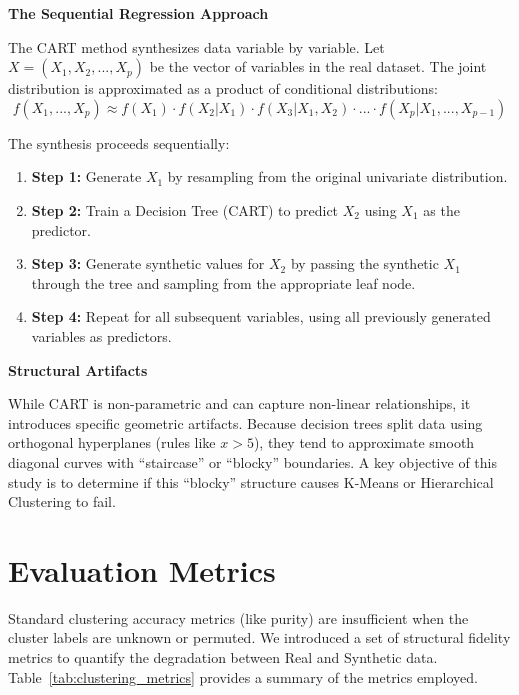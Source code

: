 \textbf{The Sequential Regression Approach}

The CART method synthesizes data variable by variable. Let $X = (X_1, X_2, ..., X_p)$ be the vector of variables in the real dataset. The joint distribution is approximated as a product of conditional distributions:
\begin{equation}
  f(X_1, ..., X_p) \approx f(X_1) \cdot f(X_2|X_1) \cdot f(X_3|X_1, X_2) \cdot ... \cdot f(X_p|X_1, ..., X_{p-1})
\end{equation}

The synthesis proceeds sequentially:
\begin{enumerate}
  \item \textbf{Step 1:} Generate $X_1$ by resampling from the original univariate distribution.
  \item \textbf{Step 2:} Train a Decision Tree (CART) to predict $X_2$ using $X_1$ as the predictor.
  \item \textbf{Step 3:} Generate synthetic values for $X_2$ by passing the synthetic $X_1$ through the tree and sampling from the appropriate leaf node.
  \item \textbf{Step 4:} Repeat for all subsequent variables, using all previously generated variables as predictors.
\end{enumerate}

\textbf{Structural Artifacts}

While CART is non-parametric and can capture non-linear relationships, it introduces specific geometric artifacts. Because decision trees split data using orthogonal hyperplanes (rules like $x > 5$), they tend to approximate smooth diagonal curves with ``staircase'' or ``blocky'' boundaries. A key objective of this study is to determine if this ``blocky'' structure causes K-Means or Hierarchical Clustering to fail.

\section{Evaluation Metrics}
\label{sec:evaluation-metrics-methods}

Standard clustering accuracy metrics (like purity) are insufficient when the cluster labels are unknown or permuted. We introduced a set of structural fidelity metrics to quantify the degradation between Real and Synthetic data. Table~\ref{tab:clustering_metrics} provides a summary of the metrics employed.

